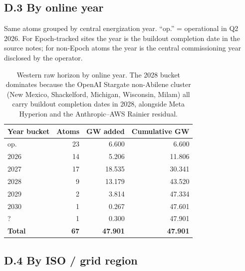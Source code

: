 \documentclass[11pt,a4paper]{article}
\begin{document}
\subsection*{D.3 \quad By online year}

\noindent Same atoms grouped by central energization year. ``op.'' = operational in Q2 2026. For Epoch-tracked sites the year is the buildout completion date in the source notes; for non-Epoch atoms the year is the central commissioning year disclosed by the operator.
\begin{table}[H]
\centering\small
\begin{tabular}{@{}lrrr@{}}
\toprule
\textbf{Year bucket} & \textbf{Atoms} & \textbf{GW added} & \textbf{Cumulative GW} \\
\midrule

op. & 23 & 6.600 & 6.600 \\

2026 & 14 & 5.206 & 11.806 \\

2027 & 17 & 18.535 & 30.341 \\

2028 & 9 & 13.179 & 43.520 \\

2029 & 2 & 3.814 & 47.334 \\

2030 & 1 & 0.267 & 47.601 \\

? & 1 & 0.300 & 47.901 \\

\midrule\textbf{Total} & \textbf{67} & \textbf{47.901} & \textbf{47.901} \\

\bottomrule
\end{tabular}
\caption{Western raw horizon by online year. The 2028 bucket dominates because the OpenAI Stargate non-Abilene cluster (New Mexico, Shackelford, Michigan, Wisconsin, Milam) all carry buildout completion dates in 2028, alongside Meta Hyperion and the Anthropic--AWS Rainier residual.}
\end{table}


\subsection*{D.4 \quad By ISO / grid region}
\end{document}
